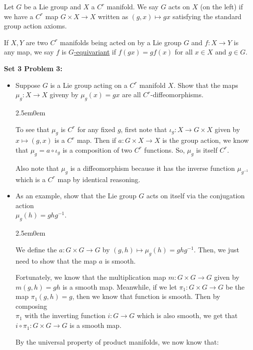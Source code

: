 \documentclass{book}
\newcommand{\hTwo}{%
\color{Black}%
   \fontsize{13}{15}\selectfont%
}
\newcommand{\Hstatement}{%
   \color{MidnightBlue!90!Black}%
   \fontsize{12}{13}\selectfont%
}
\newcommand{\HexOne}{%
   \color{Purple}%
   \fontsize{12}{13}\selectfont%
}
\newenvironment{myIndent}{%
   \begin{adjustwidth}{2.5em}{0em}%
}{%
   \end{adjustwidth}%
}
\newcommand{\udefine}[1]{{%
   \setulcolor{Red}%
   \setul{0.14em}{0.07em}%
   \ul{#1}%
}}
\newcommand{\blab}[1]{\textbf{#1}}
\newcommand{\retTwo}{\hfill\bigbreak}
\begin{document}
\hTwo Let $G$ be a Lie group and $X$ a $C^r$ manifold. We say $G$ acts on $X$ (on the left) if we have a $C^r$ map $G \times X \to X$ written as $(g, x) \mapsto gx$ satisfying the standard group action axioms.\retTwo

If $X, Y$ are two $C^r$ manifolds being acted on by a Lie group $G$ and $f: X \to Y$ is any map, we say $f$ is \udefine{$G$-equivariant} if $f(gx) = gf(x)$ for all $x \in X$ and $g \in G$.\retTwo

\Hstatement\blab{Set 3 Problem 3:}
\begin{itemize}
	\item[(i)] Suppose $G$ is a Lie group acting on a $C^r$ manifold $X$. Show that the maps $\mu_g: X \to X$ giveny by $\mu_g(x) = gx$ are all $C^r$-diffeomorphisms.
	\begin{myIndent}\HexOne
		To see that $\mu_g$ is $C^r$ for any fixed $g$, first note that $\iota_g : X \to G \times X$ given by\\ $x \mapsto (g, x)$ is a $C^r$ map. Then if $a: G \times X \to X$ is the group action, we know\\ that $\mu_g = a \circ \iota_g$ is a composition of two $C^r$ functions. So, $\mu_g$ is itself $C^r$.\retTwo

		Also note that $\mu_g$ is a diffeomorphism because it has the inverse function $\mu_{g^{-1}}$ which is a $C^r$ map by identical reasoning.\retTwo
	\end{myIndent}

	\item[(ii)] As an example, show that the Lie group $G$ acts on itself via the conjugation action\\ $\mu_g(h) = ghg^{-1}$.
	\begin{myIndent}\HexOne
		We define the $a: G \times G \to G$ by $(g, h) \mapsto \mu_g(h) = ghg^{-1}$. Then, we just need to show that the map $a$ is smooth.\retTwo

		Fortunately, we know that the multiplication map $m: G \times G \to G$ given by\\ $m(g, h) = gh$ is a smooth map. Meanwhile, if we let $\pi_1: G \times G \to G$ be the\\ map $\pi_1(g, h) = g$, then we know that function is smooth. Then by composing\\ $\pi_1$ with the inverting function $i: G \to G$ which is also smooth, we get that\\ $i \circ \pi_1: G \times G \to G$ is a smooth map.\retTwo

		By the universal property of product manifolds, we now know that:
		

\end{myIndent}
\end{itemize}
\end{document}
